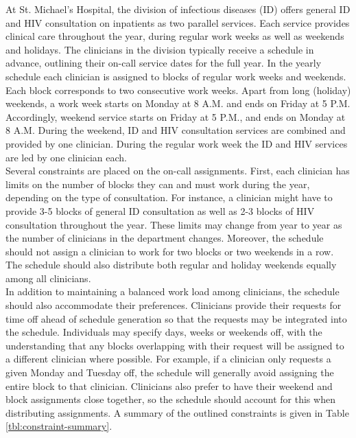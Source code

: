 At St. Michael's Hospital, the division of infectious diseases (ID) offers general ID and HIV consultation on inpatients as two parallel services. Each service provides clinical care throughout the year, during regular work weeks as well as weekends and holidays. The clinicians in the division typically receive a schedule in advance, outlining their on-call service dates for the full year. In the yearly schedule each clinician is assigned to blocks of regular work weeks and weekends. Each block corresponds to two consecutive work weeks. Apart from long (holiday) weekends, a work week starts on Monday at 8 A.M. and ends on Friday at 5 P.M. Accordingly, weekend service starts on Friday at 5 P.M., and ends on Monday at 8 A.M. During the weekend, ID and HIV consultation services are combined and provided by one clinician. During the regular work week the ID and HIV services are led by one clinician each. \\

Several constraints are placed on the on-call assignments. First, each clinician has limits on the number of blocks they can and must work during the year, depending on the type of consultation. For instance, a clinician might have to provide 3-5 blocks of general ID consultation as well as 2-3 blocks of HIV consultation throughout the year. These limits may change from year to year as the number of clinicians in the department changes. Moreover, the schedule should not assign a clinician to work for two blocks or two weekends in a row. The schedule should also distribute both regular and holiday weekends equally among all clinicians. \\

In addition to maintaining a balanced work load among clinicians, the schedule should also accommodate their preferences. Clinicians provide their requests for time off ahead of schedule generation so that the requests may be integrated into the schedule. Individuals may specify days, weeks or weekends off, with the understanding that any blocks overlapping with their request will be assigned to a different clinician where possible. For example, if a clinician only requests a given Monday and Tuesday off, the schedule will generally avoid assigning the entire block to that clinician. Clinicians also prefer to have their weekend and block assignments close together, so the schedule should account for this when distributing assignments. A summary of the outlined constraints is given in Table \ref{tbl:constraint-summary}.

